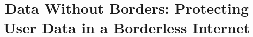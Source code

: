 \documentclass[twocolumn,10pt]{confpaper}
\begin{document}
\date{}

\title{\Large \bf Data Without Borders: Protecting
User Data in a Borderless Internet}


\maketitle

\thispagestyle{empty}






%



{\footnotesize 
\balance }
\end{document}
